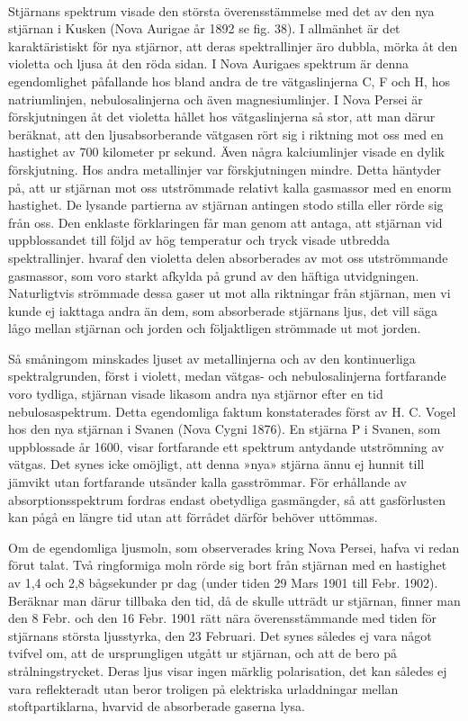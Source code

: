 \documentclass[a4paper, 12pt, oneside, swedish]{article}
\begin{document}
\paragraph{}
Stjärnans spektrum visade den största överensstämmelse med det av den nya stjärnan i Kusken (Nova Aurigae år 1892 se fig. 38). I allmänhet är det karaktäristiskt för nya stjärnor, att deras spektrallinjer äro dubbla, mörka åt den violetta och ljusa åt den röda sidan. I Nova Aurigaes spektrum är denna egendomlighet påfallande hos bland andra de tre vätgaslinjerna C, F och H, hos natriumlinjen, nebulosalinjerna och även magnesiumlinjer. I Nova Persei är förskjutningen åt det violetta hållet hos vätgaslinjerna så stor, att man därur beräknat, att den ljusabsorberande vätgasen rört sig i riktning mot oss med en hastighet av 700 kilometer pr sekund. Även några kalciumlinjer visade en dylik förskjutning. Hos andra metallinjer var förskjutningen mindre. Detta häntyder på, att ur stjärnan mot oss utströmmade relativt kalla gasmassor med en enorm hastighet. De lysande partierna av stjärnan antingen stodo stilla eller rörde sig från oss. Den enklaste förklaringen får man genom att antaga, att stjärnan vid uppblossandet till följd av hög temperatur och tryck visade utbredda spektrallinjer. hvaraf den violetta delen absorberades av mot oss utströmmande gasmassor, som voro starkt afkylda på grund av den häftiga utvidgningen. Naturligtvis strömmade dessa gaser ut mot alla riktningar från stjärnan, men vi kunde ej iakttaga andra än dem, som absorberade stjärnans ljus, det vill säga lågo mellan stjärnan och jorden och följaktligen strömmade ut mot jorden.

Så småningom minskades ljuset av metallinjerna och av den kontinuerliga spektralgrunden, först i violett, medan vätgas- och nebulosalinjerna fortfarande voro tydliga, stjärnan visade likasom andra nya stjärnor efter en tid nebulosaspektrum. Detta egendomliga faktum konstaterades först av H. C. Vogel hos den nya stjärnan i Svanen (Nova Cygni 1876). En stjärna P i Svanen, som uppblossade år 1600, visar fortfarande ett spektrum antydande utströmning av vätgas. Det synes icke omöjligt, att denna »nya» stjärna ännu ej hunnit till jämvikt utan fortfarande utsänder kalla gasströmmar. För erhållande av absorptionsspektrum fordras endast obetydliga gasmängder, så att gasförlusten kan pågå en längre tid utan att förrådet därför behöver uttömmas.

Om de egendomliga ljusmoln, som observerades kring Nova Persei, hafva vi redan förut talat. Två ringformiga moln rörde sig bort från stjärnan med en hastighet av 1,4 och 2,8 bågsekunder pr dag (under tiden 29 Mars 1901 till Febr. 1902). Beräknar man därur tillbaka den tid, då de skulle utträdt ur stjärnan, finner man den 8 Febr. och den 16 Febr. 1901 rätt nära överensstämmande med tiden för stjärnans största ljusstyrka, den 23 Februari. Det synes således ej vara något tvifvel om, att de ursprungligen utgått ur stjärnan, och att de bero på strålningstrycket. Deras ljus visar ingen märklig polarisation, det kan således ej vara reflekteradt utan beror troligen på elektriska urladdningar mellan stoftpartiklarna, hvarvid de absorberade gaserna lysa.
\end{document}
